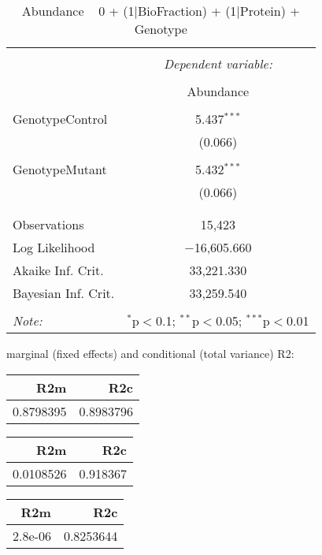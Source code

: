 \documentclass[11pt]{report}
\begin{document}
\begin{table}[!htbp] \centering 
  \caption{Abundance ~ 0 + (1|BioFraction) + (1|Protein) + Genotype} 
  \label{} 
\begin{tabular}{@{\extracolsep{5pt}}lc} 
\\[-1.8ex]\hline 
\hline \\[-1.8ex] 
 & \multicolumn{1}{c}{\textit{Dependent variable:}} \\ 
\cline{2-2} 
\\[-1.8ex] & Abundance \\ 
\hline \\[-1.8ex] 
 GenotypeControl & 5.437$^{***}$ \\ 
  & (0.066) \\ 
  & \\ 
 GenotypeMutant & 5.432$^{***}$ \\ 
  & (0.066) \\ 
  & \\ 
\hline \\[-1.8ex] 
Observations & 15,423 \\ 
Log Likelihood & $-$16,605.660 \\ 
Akaike Inf. Crit. & 33,221.330 \\ 
Bayesian Inf. Crit. & 33,259.540 \\ 
\hline 
\hline \\[-1.8ex] 
\textit{Note:}  & \multicolumn{1}{r}{$^{*}$p$<$0.1; $^{**}$p$<$0.05; $^{***}$p$<$0.01} \\ 
\end{tabular} 
\end{table} 
marginal (fixed effects) and conditional (total variance) R2:

\begin{tabular}{r|r}
\hline
R2m & R2c\\
\hline
0.8798395 & 0.8983796\\
\hline
\end{tabular}

\begin{tabular}{r|r}
\hline
R2m & R2c\\
\hline
0.0108526 & 0.918367\\
\hline
\end{tabular}

\begin{tabular}{r|r}
\hline
R2m & R2c\\
\hline
2.8e-06 & 0.8253644\\
\hline
\end{tabular}
\end{document}
